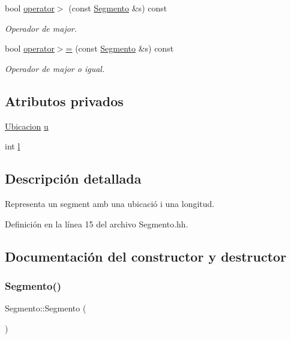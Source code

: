 \begin{DoxyCompactItemize}
bool \hyperlink{class_segmento_a01c2aa376384c7a75ef22196db361d2e}{operator$>$} (const \hyperlink{class_segmento}{Segmento} \&s) const
\begin{DoxyCompactList}\small\item\em Operador de major. \end{DoxyCompactList}\item 
bool \hyperlink{class_segmento_a74e0ca47b9bf2316a0f55351529380f6}{operator$>$=} (const \hyperlink{class_segmento}{Segmento} \&s) const
\begin{DoxyCompactList}\small\item\em Operador de major o igual. \end{DoxyCompactList}\end{DoxyCompactItemize}
\subsection*{Atributos privados}
\begin{DoxyCompactItemize}
\item 
\hyperlink{class_ubicacion}{Ubicacion} \hyperlink{class_segmento_a7fab9490df9b1b655bb88c2deb6e72ef}{u}
\item 
int \hyperlink{class_segmento_a8b59abc9de156b52370dd759beab031d}{l}
\end{DoxyCompactItemize}


\subsection{Descripción detallada}
Representa un segment amb una ubicació i una longitud. 

Definición en la línea 15 del archivo Segmento.\+hh.



\subsection{Documentación del constructor y destructor}
\mbox{\label{class_segmento_af8ce1463824db8cd38084f4f75d3b192}} 
\subsubsection{\texorpdfstring{Segmento()}{Segmento()}\hspace{0.1cm}{\footnotesize\ttfamily [1/3]}}
{\footnotesize\ttfamily Segmento\+::\+Segmento (\begin{DoxyParamCaption}{ }\end{DoxyParamCaption})}



